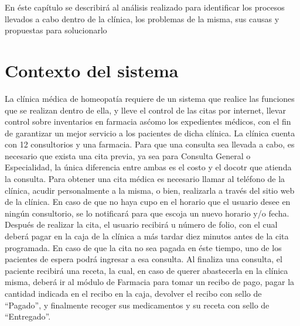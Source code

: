 En \'este cap\'itulo se describir\'a al an\'alisis realizado para identificar los procesos llevados a cabo dentro de la cl\'inica, los problemas de la misma, sus causas y propuestas para solucionarlo

\section{Contexto del sistema}

	La cl\'inica m\'edica de homeopat\'ia requiere de un sistema que realice las funciones que se realizan dentro de ella, y lleve el control de las citas por internet, llevar control sobre inventarios en farmacia as\' como los expedientes m\'edicos, con el fin de garantizar un mejor servicio a los pacientes de dicha cl\'inica.
La cl\'inica cuenta con 12 consultorios y una farmacia. Para que una consulta sea llevada a cabo, es necesario
que exista una cita previa, ya sea para Consulta General o Especialidad, la \'unica diferencia entre ambas es el costo y el docotr que atienda la consulta.
Para obtener una cita m\'edica es necesario llamar al tel\'efono de la cl\'inica, acudir personalmente a la misma, o bien, realizarla a trav\'es del sitio web de la cl\'inica. En caso de que no haya cupo en el horario que el usuario desee en ning\'un consultorio, se lo notificar\'a para que escoja un nuevo horario y/o fecha. Despu\'es de realizar la cita, el usuario recibir\'a u n\'umero de folio, con el cual deber\'a pagar en la caja de la cl\'inica a m\'as tardar diez minutos antes de la cita programada. En caso de que la cita no sea pagada en \'este tiempo, uno de los pacientes de espera podr\'a ingresar a esa consulta.
Al finaliza una consulta, el paciente recibir\'a una receta, la cual, en caso de querer abastecerla en la cl\'inica misma, deber\'a ir al m\'odulo de Farmacia para tomar un recibo de pago, pagar la cantidad indicada en el recibo en la caja, devolver el recibo con sello de "`Pagado"', y finalmente recoger sus medicamentos y su receta con sello de "`Entregado"'.


